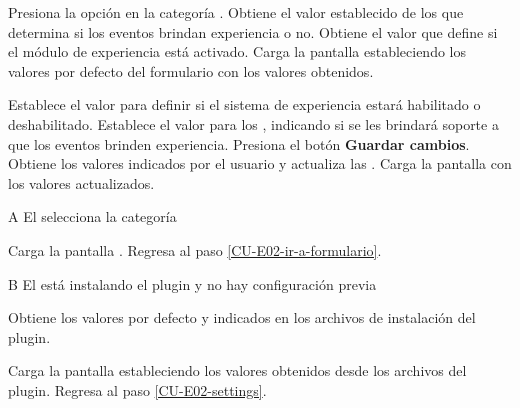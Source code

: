 \begin{UCtrayectoria}%
%
   

  \Actor Presiona la opción {\bf {}} en la categoría
         .  \label{CU-E02-ir-a-formulario}
  \Sistema Obtiene el valor establecido de los  que determina si los eventos brindan
           experiencia o no. \label{CU-E03-formulario} 
  \Sistema Obtiene el valor  que define si el
           módulo de experiencia está activado.
  \Sistema Carga la pantalla  estableciendo los valores por defecto del
           formulario con los valores obtenidos.

  \Actor Establece el valor  para definir si
         el sistema de experiencia estará habilitado o deshabilitado.
         \label{CU-E02-settings}
  \Actor Establece el valor para los , indicando si se les brindará soporte a que
         los eventos brinden experiencia.
  \Actor Presiona el botón {\bf Guardar cambios}.
  \Sistema Obtiene los valores indicados por el usuario y actualiza las
           .
  \Sistema Carga la pantalla  con los valores actualizados.

\end{UCtrayectoria}

\begin{UCtrayectoriaA}{A}{%
El  selecciona la categoría }

    \Sistema Carga la pantalla .
    \Sistema Regresa al paso \ref{CU-E02-ir-a-formulario}.
\end{UCtrayectoriaA}

\begin{UCtrayectoriaA}{B}{%
El  está instalando el plugin y no hay configuración previa }

  \Sistema Obtiene los valores por defecto  y
            indicados en los archivos de instalación del
           plugin.

  \Sistema Carga la pantalla  estableciendo los valores obtenidos desde los
           archivos del plugin.
  \Sistema Regresa al paso \ref{CU-E02-settings}.
\end{UCtrayectoriaA}
